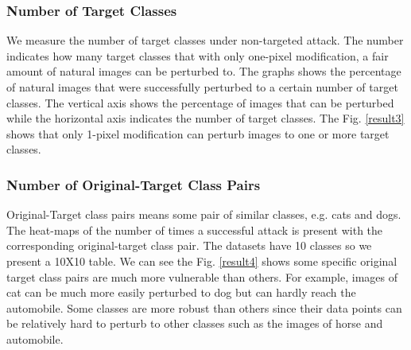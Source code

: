 \documentclass[runningheads]{llncs}
\begin{document}
\subsubsection{Number of Target Classes} 
We measure the number of target classes under non-targeted attack. The number indicates how many target classes that with only one-pixel modification, a fair amount of natural images can be perturbed to. The graphs shows the percentage of natural images that were successfully perturbed to a certain number of target classes. The vertical axis shows the percentage of images that can be perturbed while the horizontal axis indicates the number of target classes. The Fig. \ref{result3} shows that only 1-pixel modification can perturb images to one or more target classes.

\subsubsection{Number of Original-Target Class Pairs} 
Original-Target class pairs means some pair of similar classes, e.g. cats and dogs. The heat-maps of the number of times a successful attack is present with the corresponding original-target class pair. The datasets have 10 classes so we present a 10X10 table. We can see the Fig. \ref{result4} shows some specific original target class pairs are much more vulnerable than others. For example, images of cat can be much more easily perturbed to dog but can hardly reach the automobile. Some classes are more robust than others since their data points can be relatively hard to perturb to other classes such as the images of horse and automobile. 
\end{document}
